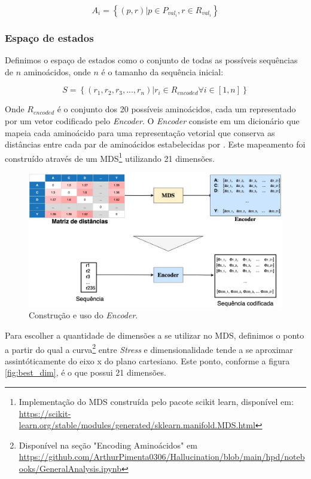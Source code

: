\begin{equation}
A_{i} = \left\{(p, r) | p \in P_{val_{i}} , r \in R_{val_{i}} \right\}
\end{equation}
  

\subsubsection{Espaço de estados}
Definimos o espaço de estados como o conjunto de todas as possíveis sequências de $n$ aminoácidos, 
onde $n$ é o tamanho da sequência inicial:

\begin{equation}
S = \left\{(r_{1}, r_{2}, r_{3}, ..., r_{n}) | r_{i} \in R_{encoded} \forall i \in [1,n] \right\}
\end{equation}

Onde $R_{encoded}$ é o conjunto dos 20 possíveis aminoácidos, 
cada um representado por um vetor codificado pelo \textit{Encoder}. 
O \textit{Encoder} consiste em um dicionário que mapeia cada aminoácido para 
uma representação vetorial que conserva as distâncias entre cada par de aminoácidos estabelecidas por \cite{aminodist}.
Este mapeamento foi construído através de um MDS\footnote{Implementação do MDS construída pelo pacote scikit learn, disponível em: \url{https://scikit-learn.org/stable/modules/generated/sklearn.manifold.MDS.html}} utilizando 21 dimensões. 

\begin{figure}[H]
  \centering
  \includegraphics[width=.8\textwidth]{figuras/metodologia-encoder.jpg}
  \caption{Construção e uso do \textit{Encoder}. }
  \label{fig:encoder}
\end{figure}

Para escolher a quantidade de dimensões a se utilizar no MDS, 
definimos o ponto a partir do qual a curva\footnote{Disponível na seção "Encoding Aminoácidos" em \url{https://github.com/ArthurPimenta0306/Hallucination/blob/main/hpd/notebooks/GeneralAnalysis.ipynb}} entre \textit{Stress} e dimensionalidade 
tende a se aproximar assintóticamente do eixo x do plano cartesiano. 
Este ponto, conforme a figura \ref{fig:best_dim}, é o que possui 21 dimensões. 

